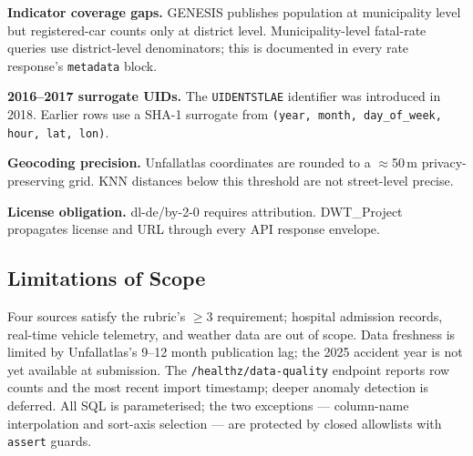 \documentclass[12pt,a4paper]{article}
\begin{document}
\textbf{Indicator coverage gaps.} GENESIS publishes population at municipality level but registered-car counts only at district level. Municipality-level fatal-rate queries use district-level denominators; this is documented in every rate response's \texttt{metadata} block.

\textbf{2016--2017 surrogate UIDs.} The \texttt{UIDENTSTLAE} identifier was introduced in 2018. Earlier rows use a SHA-1 surrogate from \texttt{(year, month, day\_of\_week, hour, lat, lon)}.

\textbf{Geocoding precision.} Unfallatlas coordinates are rounded to a $\approx$50\,m privacy-preserving grid. KNN distances below this threshold are not street-level precise.

\textbf{License obligation.} dl-de/by-2-0 requires attribution. DWT\_Project propagates license and URL through every API response envelope.

\subsection{Limitations of Scope}

Four sources satisfy the rubric's $\geq 3$ requirement; hospital admission records, real-time vehicle telemetry, and weather data are out of scope. Data freshness is limited by Unfallatlas's 9--12 month publication lag; the 2025 accident year is not yet available at submission. The \texttt{/healthz/data-quality} endpoint reports row counts and the most recent import timestamp; deeper anomaly detection is deferred. All SQL is parameterised; the two exceptions --- column-name interpolation and sort-axis selection --- are protected by closed allowlists with \texttt{assert} guards.
\end{document}
